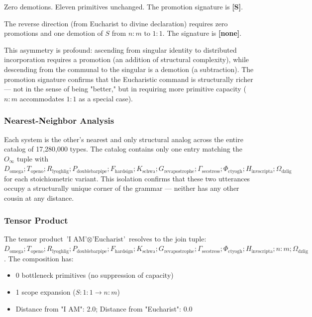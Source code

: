 \documentclass[12pt,a4paper]{article}
\begin{document}
Zero demotions. Eleven primitives unchanged. The promotion signature is \textbf{{[}S{]}}.

The reverse direction (from Eucharist to divine declaration) requires zero promotions and one demotion of $S$ from $n{:}m$ to $1{:}1$. The signature is \textbf{{[}none{]}}.

This asymmetry is profound: ascending from singular identity to distributed incorporation requires a promotion (an addition of structural complexity), while descending from the communal to the singular is a demotion (a subtraction). The promotion signature confirms that the Eucharistic command is structurally richer --- not in the sense of being "better," but in requiring more primitive capacity ($n{:}m$ accommodates $1{:}1$ as a special case).

\subsubsection{Nearest-Neighbor Analysis}

Each system is the other's nearest and only structural analog across the entire catalog of 17,280,000 types. The catalog contains only one entry matching the $O_{\infty}$ tuple with $D_{\text{omega}}; T_{\text{openo}}; R_{\text{lyoghlig}}; P_{\text{doublebarpipe}}; F_{\text{hardsign}}; K_{\text{schwa}}; G_{\text{revapostrophe}}; \Gamma_{\text{secstress}}; \Phi_{\text{ctyogh}}; H_{\text{invscripta}}; \Omega_{\text{dzlig}}$ for each stoichiometric variant. This isolation confirms that these two utterances occupy a structurally unique corner of the grammar --- neither has any other cousin at any distance.

\subsubsection{Tensor Product}

The tensor product $\text{'I AM'} \otimes \text{'Eucharist'}$ resolves to the join tuple: $D_{\text{omega}}; T_{\text{openo}}; R_{\text{lyoghlig}}; P_{\text{doublebarpipe}}; F_{\text{hardsign}}; K_{\text{schwa}}; G_{\text{revapostrophe}}; \Gamma_{\text{secstress}}; \Phi_{\text{ctyogh}}; H_{\text{invscripta}}; n{:}m; \Omega_{\text{dzlig}}$. The composition has:

\begin{itemize}
    \item 0 bottleneck primitives (no suppression of capacity)
    \item 1 scope expansion ($S: 1{:}1 \to n{:}m$)
    \item Distance from "I AM": 2.0; Distance from "Eucharist": 0.0
\end{itemize}
\end{document}
